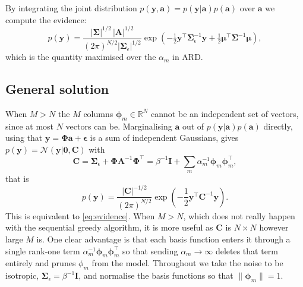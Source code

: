 \documentclass[a4paper]{article}
\renewcommand{\vec}[1]{\boldsymbol{#1}}
\begin{document}
By integrating the joint distribution $p(\mathbf y, \mathbf a) = p(\mathbf y|\mathbf a) p(\mathbf a)$ over $\mathbf a$ we  compute the evidence:
\begin{equation} \label{eq:evidence}
    p(\mathbf y) = \frac{|\mathbf \Sigma|^{1/2} \, |\mathbf A|^{1/2}}{(2 \pi)^{N/2} |\mathbf \Sigma_\epsilon|^{1/2}} \exp \left( - \tfrac{1}{2} \mathbf{y}^\top \mathbf{\Sigma}_\epsilon^{-1} \mathbf{y} + \tfrac{1}{2} \mathbf \mu^\top \mathbf{\Sigma}^{-1} \mathbf \mu \right),
\end{equation}
which is the quantity maximised over the $\alpha_m$ in ARD.



\subsection{General solution}

When $M > N$ the $M$ columns $\vec \phi_m \in \mathbb{R}^N$ cannot be an independent set of vectors, since at most $N$ vectors can be. Marginalising $\mathbf a$ out of $p(\mathbf y|\mathbf a) p(\mathbf a)$ directly, using that $\mathbf y = \mathbf{\Phi} \mathbf a + \vec \epsilon$ is a sum of independent Gaussians, gives $p(\mathbf y) = \mathcal N (\mathbf y | \mathbf 0, \mathbf C)$ with
\begin{equation} \label{eq:C}
    \mathbf C = \mathbf \Sigma_\epsilon + \mathbf{\Phi} \mathbf{A}^{-1} \mathbf{\Phi}^\top = \beta^{-1} \mathbf{I} + \sum_m \alpha_m^{-1} \vec \phi_m \vec \phi_m^\top,
\end{equation}
that is
\begin{equation} \label{eq:evidence_C}
    p(\mathbf y) = \frac{|\mathbf C|^{-1/2}}{(2 \pi)^{N/2}} \exp \left( -\frac{1}{2} \mathbf y^\top \mathbf C^{-1} \mathbf y \right).
\end{equation}
This is equivalent to \eqref{eq:evidence}. When $M>N$, which does not really happen with the sequential greedy algorithm, it is more useful as $\mathbf C$ is $N \times N$ however large $M$ is. One clear advantage is that each basis function enters it through a single rank-one term $\alpha_m^{-1} \vec \phi_m \vec \phi_m^\top$ so that sending $\alpha_m \to \infty$ deletes that term entirely and prunes $\phi_m$ from the model. Throughout we take the noise to be isotropic, $\mathbf \Sigma_\epsilon = \beta^{-1}\mathbf{I}$, and normalise the basis functions so that $\|\vec \phi_m\| = 1$.
\end{document}
